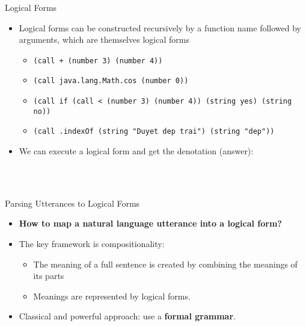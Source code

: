 \documentclass{beamer}
\begin{document}
\begin{frame}{Logical Forms}
    \begin{itemize}
        \item Logical forms can be constructed recursively by a function name
followed by arguments, which are themselves logical forms
        \begin{itemize}
            \item \texttt{(call + (number 3) (number 4))}
            \item \texttt{(call java.lang.Math.cos (number 0))}
            \item \texttt{(call if (call < (number 3) (number 4)) (string yes) (string no))}
            \item \texttt{(call .indexOf (string "Duyet dep trai") (string "dep"))}
        \end{itemize}
        \item We can execute a logical form and get the denotation (answer): 
        \begin{center}
            \centering
            \\
            \Downarrow \\
        \end{center}
    \end{itemize}
\end{frame}

\begin{frame}{Parsing Utterances to Logical Forms}
    \begin{itemize}
        \item \textbf{How to map a natural language utterance into a logical form?}
        \item The key framework is compositionality:
        \begin{itemize}
            \item The meaning of a full sentence is created by combining the meanings of its parts
            \item Meanings are represented by logical forms.
        \end{itemize}
        \item Classical and powerful approach: use a \textbf{formal grammar}.
    \end{itemize}
\end{frame}
\end{document}

